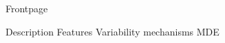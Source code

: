 \documentclass{article}
\begin{document}
{Frontpage}

\tableofcontents
\newpage
{Description}
{Features}
{Variability mechanisms}
{MDE}
\end{document}
